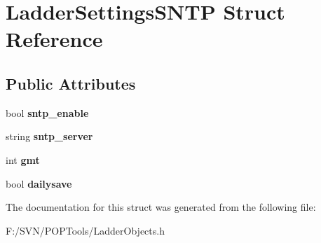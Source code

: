 \hypertarget{struct_ladder_settings_s_n_t_p}{\section{Ladder\-Settings\-S\-N\-T\-P Struct Reference}
\label{struct_ladder_settings_s_n_t_p}
}
\subsection*{Public Attributes}
\begin{DoxyCompactItemize}
\item 
\hypertarget{struct_ladder_settings_s_n_t_p_a8519d8902b02d432774cd831baedbea5}{bool {\bfseries sntp\-\_\-enable}}\label{struct_ladder_settings_s_n_t_p_a8519d8902b02d432774cd831baedbea5}

\item 
\hypertarget{struct_ladder_settings_s_n_t_p_ac3cae47a3e5fda644d26937f6f8e19de}{string {\bfseries sntp\-\_\-server}}\label{struct_ladder_settings_s_n_t_p_ac3cae47a3e5fda644d26937f6f8e19de}

\item 
\hypertarget{struct_ladder_settings_s_n_t_p_aa5ce4559192897d99e7b31a71ac9815d}{int {\bfseries gmt}}\label{struct_ladder_settings_s_n_t_p_aa5ce4559192897d99e7b31a71ac9815d}

\item 
\hypertarget{struct_ladder_settings_s_n_t_p_a4987aaf7f3aff5c8a966188004674bb3}{bool {\bfseries dailysave}}\label{struct_ladder_settings_s_n_t_p_a4987aaf7f3aff5c8a966188004674bb3}

\end{DoxyCompactItemize}


The documentation for this struct was generated from the following file\-:\begin{DoxyCompactItemize}
\item 
F\-:/\-S\-V\-N/\-P\-O\-P\-Tools/Ladder\-Objects.\-h\end{DoxyCompactItemize}
